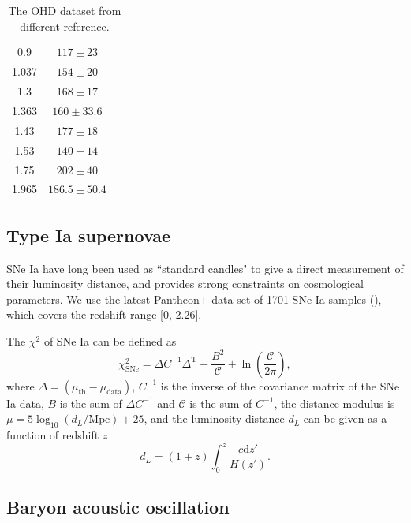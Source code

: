 \documentclass[twocolumn]{aastex631}
\begin{document}
\begin{table}
\begin{tabular}{ccl}
         0.9 & $117 \pm 23$ & \cite{PhysRevD.71.123001} \\
         1.037 & $154 \pm 20$ & \cite{M.Moresco_2012} \\
         1.3 & $168 \pm 17$ & \cite{PhysRevD.71.123001} \\
         1.363 & $160 \pm 33.6$ & \cite{10.1093/mnrasl/slv037} \\
         1.43 & $177 \pm 18$ & \cite{PhysRevD.71.123001} \\
         1.53 & $140 \pm 14$ & \cite{PhysRevD.71.123001} \\
         1.75 & $202 \pm 40$ & \cite{PhysRevD.71.123001} \\
         1.965 & $186.5 \pm 50.4$ & \cite{10.1093/mnrasl/slv037} \\
         \hline\hline    
      \end{tabular}
      \caption{The OHD dataset from different reference.}
      \label{tab:1}
   \end{table}

\subsection{Type Ia supernovae}

   SNe Ia have long been used as ``standard candles" to give a direct
   measurement of their luminosity distance, and provides strong constraints
   on cosmological parameters. We use the latest Pantheon+ data set of 1701 
   SNe Ia samples (\cite{Scolnic_2022}), which covers the redshift range [0, 2.26].
   
   The $\chi^2$ of SNe Ia can be defined as 
   \begin{equation}
      \chi_{\text{SNe}}^2=\Delta C^{-1} \Delta^{\text{T}}-\frac{B^2}{\mathcal{C}}+\ln\left(\frac{\mathcal{C}}{2\pi}\right),
      \label{eq:15}
   \end{equation}
   where $\Delta=(\mu_{\text{th}}-\mu_{\text{data}})$, $C^{-1}$ is the inverse of the
   covariance matrix of the SNe Ia data, $B$ is the sum of $\Delta C^{-1}$ and 
   $\mathcal{C}$ is the sum of $C^{-1}$, the distance modulus is 
   $\mu=5\log_{10}(d_L/\text{Mpc})+25$, and the luminosity distance $d_L$ 
   can be given as a function of redshift $z$
   \begin{equation}
      d_L=(1+z)\int_0^z\frac{c\mathrm{d}z'}{H(z')}.
      \label{eq:16}
   \end{equation}

\subsection{Baryon acoustic oscillation}
\end{document}

